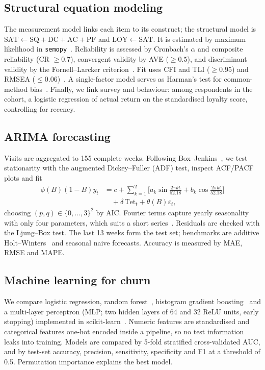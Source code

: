 \documentclass[conference]{IEEEtran}
\begin{document}
\subsection{Structural equation modeling}
The measurement model links each item to its construct; the structural model is $\mathrm{SAT}\leftarrow\mathrm{SQ}+\mathrm{DC}+\mathrm{AC}+\mathrm{PF}$ and $\mathrm{LOY}\leftarrow\mathrm{SAT}$. It is estimated by maximum likelihood in \texttt{semopy}~\cite{semopy2020}. Reliability is assessed by Cronbach's $\alpha$ and composite reliability (CR $\ge0.7$), convergent validity by AVE ($\ge0.5$), and discriminant validity by the Fornell--Larcker criterion~\cite{fornell1981}. Fit uses CFI and TLI ($\ge0.95$) and RMSEA ($\le0.06$)~\cite{hu1999}. A single-factor model serves as Harman's test for common-method bias~\cite{podsakoff2003}. Finally, we link survey and behaviour: among respondents in the cohort, a logistic regression of actual return on the standardised loyalty score, controlling for recency.

\subsection{ARIMA forecasting}
Visits are aggregated to 155 complete weeks. Following Box--Jenkins~\cite{box2015}, we test stationarity with the augmented Dickey--Fuller (ADF) test, inspect ACF/PACF plots and fit
\begin{align}
\phi(B)(1-B)y_t &= c+\textstyle\sum_{k=1}^{2}\big[a_k\sin\tfrac{2\pi kt}{52.18}+b_k\cos\tfrac{2\pi kt}{52.18}\big]\nonumber\\
&\quad+\delta\,\mathrm{Tet}_t+\theta(B)\varepsilon_t,
\end{align}
choosing $(p,q)\in\{0,\dots,3\}^2$ by AIC. Fourier terms capture yearly seasonality with only four parameters, which suits a short series~\cite{hyndman2021}. Residuals are checked with the Ljung--Box test. The last 13 weeks form the test set; benchmarks are additive Holt--Winters~\cite{winters1960} and seasonal naive forecasts. Accuracy is measured by MAE, RMSE and MAPE.

\subsection{Machine learning for churn}
We compare logistic regression, random forest~\cite{breiman2001}, histogram gradient boosting~\cite{friedman2001} and a multi-layer perceptron (MLP; two hidden layers of 64 and 32 ReLU units, early stopping) implemented in scikit-learn~\cite{pedregosa2011}. Numeric features are standardised and categorical features one-hot encoded inside a pipeline, so no test information leaks into training. Models are compared by 5-fold stratified cross-validated AUC, and by test-set accuracy, precision, sensitivity, specificity and F1 at a threshold of 0.5. Permutation importance explains the best model.
\end{document}
